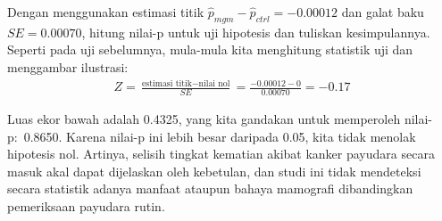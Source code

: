 \begin{examplewrap}
\begin{nexample}{Dengan menggunakan estimasi titik $\hat{p}_{mgm} - \hat{p}_{ctrl} = -0.00012$ dan galat baku $SE = 0.00070$, hitung nilai-p untuk uji hipotesis dan tuliskan kesimpulannya.}
Seperti pada uji sebelumnya, mula-mula kita menghitung statistik uji dan menggambar ilustrasi:
\begin{align*}
Z = \frac{\text{estimasi titik} - \text{nilai nol}}{SE}
	= \frac{-0.00012 - 0}{0.00070}
	= -0.17
\end{align*}
\begin{center}
\end{center}
Luas ekor bawah adalah 0.4325, yang kita gandakan untuk memperoleh nilai-p:~0.8650. Karena nilai-p ini lebih besar daripada 0.05, kita tidak menolak hipotesis nol. Artinya, selisih tingkat kematian akibat kanker payudara secara masuk akal dapat dijelaskan oleh kebetulan, dan studi ini tidak mendeteksi secara statistik adanya manfaat ataupun bahaya mamografi dibandingkan pemeriksaan payudara rutin.
\end{nexample}
\end{examplewrap}

